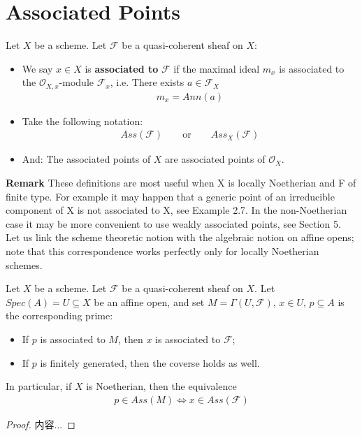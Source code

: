 \documentclass[Total.tex]{subfiles}
\begin{document}
		\section{Associated Points}
			\begin{Def}
				Let $X$ be a scheme. Let $\mathcal{F}$ be a quasi-coherent sheaf on $X$:
				
				\begin{itemize}
					\item We say $x\in X$ is \textbf{associated to} $\mathcal{F}$ if the maximal ideal $m_x$ is associated to the $\mathcal{O}_{X,x}$-module $\mathcal{F}_x$, i.e. There exists $a\in \mathcal{F}_X$
					\begin{gather*}
						m_x=Ann(a)
					\end{gather*}
					\item Take the following notation:
					\begin{gather*}
						Ass(\mathcal{F})\qquad \mbox{or}\qquad Ass_X(\mathcal{F})
					\end{gather*}
					\item And: The associated points of $X$ are associated points of $\mathcal{O}_X$.
				\end{itemize}
			\end{Def}
			\textbf{Remark} These definitions are most useful when X is locally Noetherian and F of finite type.
			For example it may happen that a generic point of an irreducible component of X
			is not associated to X, see Example 2.7. In the non-Noetherian case it may be
			more convenient to use weakly associated points, see Section 5. Let us link the
			scheme theoretic notion with the algebraic notion on affine opens; note that this
			correspondence works perfectly only for locally Noetherian schemes.
			
			\begin{lemma}
				Let $X$ be a scheme. Let $\mathcal{F}$ be a quasi-coherent sheaf on $X$. Let $Spec(A)=U\subseteq X$ be an affine open, and set $M=\Gamma(U,\mathcal{F})$, $x\in U$, $p\subseteq A$ is the corresponding prime:
				\begin{itemize}
					\item If $p$ is associated to $M$, then $x$ is associated to $\mathcal{F}$;
					\item If $p$ is finitely generated, then the coverse holds as well.
				\end{itemize}
				In particular, if $X$ is Noetherian, then the equivalence
				\begin{gather*}
					p\in Ass(M)\Leftrightarrow x\in Ass(\mathcal{F})
				\end{gather*}
			\end{lemma}
			\begin{proof}
				内容...
			\end{proof}
\end{document}
